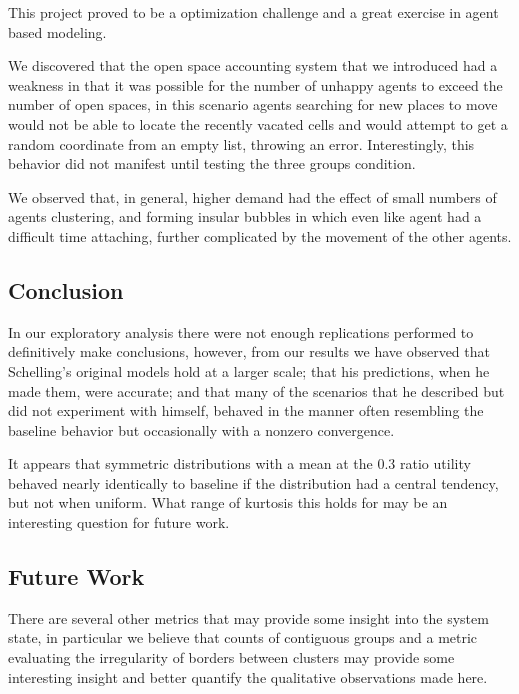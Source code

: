 \documentclass[sigplan,nonacm]{acmart}
\begin{document}
This project proved to be a optimization challenge and a great exercise in agent based modeling.

We discovered that the open space accounting system that we introduced had a weakness in that it was possible 
for the number of unhappy agents to exceed the number of open spaces,
in this scenario agents searching for new places to move would not be able to locate the recently vacated cells and would
attempt to get a random coordinate from an empty list, throwing an error. Interestingly, this behavior did not manifest until testing the three groups condition.

We observed that, in general, higher demand had the effect of small numbers of agents clustering, and forming insular bubbles in which even like agent had a difficult time
attaching, further complicated by the movement of the other agents.

\subsection{Conclusion}

In our exploratory analysis there were not enough replications performed to definitively make conclusions, however, from our results
we have observed that Schelling's original models hold at a larger scale; that his predictions, when he made them, were accurate;
and that many of the scenarios that he described but did not experiment with himself, behaved in the manner often resembling
the baseline behavior but occasionally with a nonzero convergence.

It appears that symmetric distributions with a mean at the 0.3 ratio utility behaved nearly identically to baseline if
the distribution had a central tendency, but not when uniform. 
What range of kurtosis this holds for may be an interesting question for future work.

\subsection{Future Work}

There are several other metrics that may provide some insight into the system state, in particular we believe that 
counts of contiguous groups and a metric evaluating the irregularity of borders between clusters may provide some interesting insight
and better quantify the qualitative observations made here.





\end{document}
